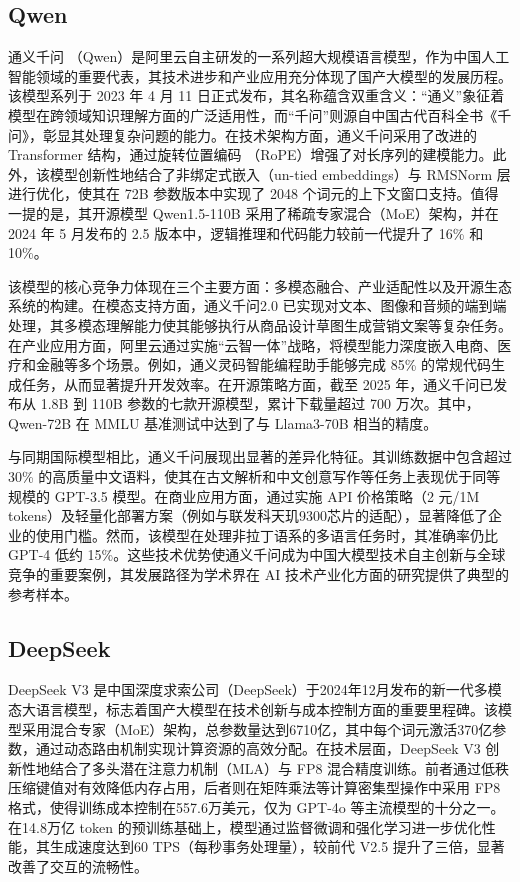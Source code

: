 \subsection{Qwen}
\label{sec:TOSWT-gen-qwen}

通义千问 \cite{qwen2025qwen25technicalreport}（Qwen）是阿里云自主研发的一系列超大规模语言模型，作为中国人工智能领域的重要代表，其技术进步和产业应用充分体现了国产大模型的发展历程。该模型系列于 2023 年 4 月 11 日正式发布，其名称蕴含双重含义：“通义”象征着模型在跨领域知识理解方面的广泛适用性，而“千问”则源自中国古代百科全书《千问》，彰显其处理复杂问题的能力。在技术架构方面，通义千问采用了改进的 Transformer 结构，通过旋转位置编码 \cite{su2023roformerenhancedtransformerrotary}（RoPE）增强了对长序列的建模能力。此外，该模型创新性地结合了非绑定式嵌入（un-tied embeddings）与 RMSNorm 层进行优化，使其在 72B 参数版本中实现了 2048 个词元的上下文窗口支持。值得一提的是，其开源模型 Qwen1.5-110B 采用了稀疏专家混合（MoE）架构，并在 2024 年 5 月发布的 2.5 版本中，逻辑推理和代码能力较前一代提升了 16\% 和 10\%。

该模型的核心竞争力体现在三个主要方面：多模态融合、产业适配性以及开源生态系统的构建。在模态支持方面，通义千问2.0 已实现对文本、图像和音频的端到端处理，其多模态理解能力使其能够执行从商品设计草图生成营销文案等复杂任务。在产业应用方面，阿里云通过实施“云智一体”战略，将模型能力深度嵌入电商、医疗和金融等多个场景。例如，通义灵码智能编程助手能够完成 85\% 的常规代码生成任务，从而显著提升开发效率。在开源策略方面，截至 2025 年，通义千问已发布从 1.8B 到 110B 参数的七款开源模型，累计下载量超过 700 万次。其中，Qwen-72B 在 MMLU 基准测试中达到了与 Llama3-70B 相当的精度。

与同期国际模型相比，通义千问展现出显著的差异化特征。其训练数据中包含超过 30\% 的高质量中文语料，使其在古文解析和中文创意写作等任务上表现优于同等规模的 GPT-3.5 模型。在商业应用方面，通过实施 API 价格策略（2 元/1M tokens）及轻量化部署方案（例如与联发科天玑9300芯片的适配），显著降低了企业的使用门槛。然而，该模型在处理非拉丁语系的多语言任务时，其准确率仍比 GPT-4 低约 15\%。这些技术优势使通义千问成为中国大模型技术自主创新与全球竞争的重要案例，其发展路径为学术界在 AI 技术产业化方面的研究提供了典型的参考样本。

\subsection{DeepSeek}
\label{sec:TOSWT-gen-ds}

DeepSeek V3 \cite{deepseekai2024deepseekv3technicalreport} 是中国深度求索公司（DeepSeek）于2024年12月发布的新一代多模态大语言模型，标志着国产大模型在技术创新与成本控制方面的重要里程碑。该模型采用混合专家（MoE）架构，总参数量达到6710亿，其中每个词元激活370亿参数，通过动态路由机制实现计算资源的高效分配。在技术层面，DeepSeek V3 创新性地结合了多头潜在注意力机制（MLA）与 FP8 混合精度训练。前者通过低秩压缩键值对有效降低内存占用，后者则在矩阵乘法等计算密集型操作中采用 FP8 格式，使得训练成本控制在557.6万美元，仅为 GPT-4o 等主流模型的十分之一。在14.8万亿 token 的预训练基础上，模型通过监督微调和强化学习进一步优化性能，其生成速度达到60 TPS（每秒事务处理量），较前代 V2.5 提升了三倍，显著改善了交互的流畅性。

